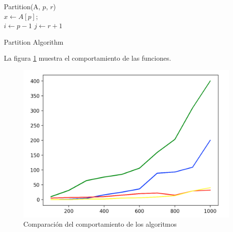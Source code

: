 \documentclass[conference]{IEEEtran}
\begin{document}
\begin{algorithm}[h]
 Partition(A, $p$, $r$){ \\
  $x \leftarrow A[p]$;\\
  $i \leftarrow p-1$
  $j \leftarrow r+1$
}
\caption{Partition Algorithm}
\label{partition}
\end{algorithm}



La figura \ref{fig:grafica} muestra el comportamiento de las funciones.

\begin{figure}
	\centering
	\includegraphics[width=1.0\columnwidth]{Imagenes/grafica1.png}
	\caption{Comparaci\'on del comportamiento de los algoritmos}
	\label{fig:grafica}
\end{figure}
\end{document}
